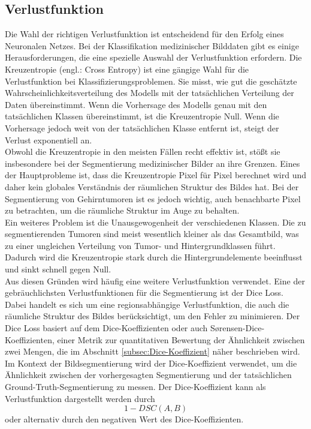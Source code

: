 \subsection{Verlustfunktion}
Die Wahl der richtigen Verlustfunktion ist entscheidend für den Erfolg eines Neuronalen Netzes. Bei der Klassifikation medizinischer Bilddaten gibt es einige Herausforderungen, die eine spezielle Auswahl der Verlustfunktion erfordern.
Die Kreuzentropie (engl.: Cross Entropy) ist eine gängige Wahl für die Verlustfunktion bei Klassifizierungsproblemen. Sie misst, wie gut die geschätzte Wahrscheinlichkeitsverteilung des Modells mit der tatsächlichen Verteilung der Daten übereinstimmt. Wenn die Vorhersage des Modells genau mit den tatsächlichen Klassen übereinstimmt, ist die Kreuzentropie Null. Wenn die Vorhersage jedoch weit von der tatsächlichen Klasse entfernt ist, steigt der Verlust exponentiell an. \cite[vgl.][]{Murphy2012}\\
Obwohl die Kreuzentropie in den meisten Fällen recht effektiv ist, stößt sie insbesondere bei der Segmentierung medizinischer Bilder an ihre Grenzen. Eines der Hauptprobleme ist, dass die Kreuzentropie Pixel für Pixel berechnet wird und daher kein globales Verständnis der räumlichen Struktur des Bildes hat. Bei der Segmentierung von Gehirntumoren ist es jedoch wichtig, auch benachbarte Pixel zu betrachten, um die räumliche Struktur im Auge zu behalten. \\
Ein weiteres Problem ist die Unausgewogenheit der verschiedenen Klassen. Die zu segmentierenden Tumoren sind meist wesentlich kleiner als das Gesamtbild, was zu einer ungleichen Verteilung von Tumor- und Hintergrundklassen führt. Dadurch wird die Kreuzentropie stark durch die Hintergrundelemente beeinflusst und sinkt schnell gegen Null. \cite[][]{Yeung2021}\\
Aus diesen Gründen wird häufig eine weitere Verlustfunktion verwendet. Eine der gebräuchlichsten Verlustfunktionen für die Segmentierung ist der Dice Loss. Dabei handelt es sich um eine regionsabhängige Verlustfunktion, die auch die räumliche Struktur des Bildes berücksichtigt, um den Fehler zu minimieren. Der Dice Loss basiert auf dem Dice-Koeffizienten oder auch Sørensen-Dice-Koeffizienten, einer Metrik zur quantitativen Bewertung der Ähnlichkeit zwischen zwei Mengen, die im Abschnitt \ref{subsec:Dice-Koeffizient} näher beschrieben wird. 
Im Kontext der Bildsegmentierung wird der Dice-Koeffizient verwendet, um die Ähnlichkeit zwischen der vorhergesagten Segmentierung und der tatsächlichen Ground-Truth-Segmentierung zu messen. Der Dice-Koeffizient kann als Verlustfunktion dargestellt werden durch 
\begin{equation}
  1 - DSC(A,B)
\end{equation}
oder alternativ durch den negativen Wert des Dice-Koeffizienten. \cite[vgl.][]{Sudre2017}

